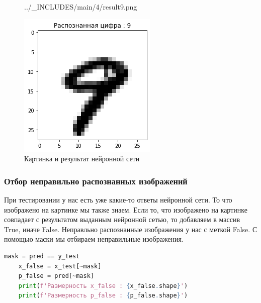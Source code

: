 \begin{figure}[!htp]
\begin{minipage}[h]{0.19\linewidth}
        {../_INCLUDES/main/4/result9.png}
    \end{minipage}
    \hfill
    \begin{minipage}[h]{0.19\linewidth}
        \centering
        \includegraphics[width=\linewidth]
        {../_INCLUDES/main/4/result10.png}
    \end{minipage}

    \caption{Картинка и результат нейронной сети}
    \label{fig:4_img_and_result}
\end{figure}



\subsubsection{Отбор неправильно распознанных изображений}

При тестировании у нас есть уже какие-то ответы нейронной сети. То что изображено на картинке мы также знаем. Если то, что изображено на картинке совпадает с результатом выданным нейронной сетью, то добавляем в массив True, иначе False. Неправльно распознанные изображения у нас с меткой False. С помощью маски мы отбираем неправильные изображения.

\begin{lstlisting}[language=Python,]
    mask = pred == y_test
    x_false = x_test[~mask]
    p_false = pred[~mask]
    print(f'Размерность x_false : {x_false.shape}')
    print(f'Размерность p_false : {p_false.shape}')
\end{lstlisting}

